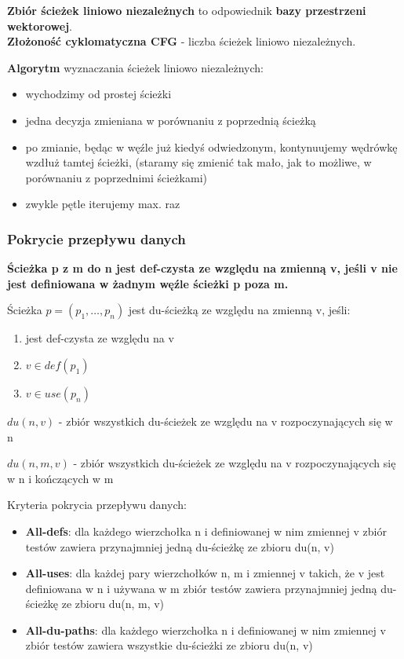 \documentclass[../main.tex]{subfiles}
\begin{document}
    \textbf{Zbiór ścieżek liniowo niezależnych} to odpowiednik \textbf{bazy przestrzeni wektorowej}.\\
    \textbf{Złożoność cyklomatyczna CFG} - liczba ścieżek liniowo niezależnych.

    \textbf{Algorytm} wyznaczania ścieżek liniowo niezależnych:
    \begin{itemize}
        \item wychodzimy od prostej ścieżki
        \item jedna decyzja zmieniana w porównaniu z poprzednią ścieżką
        \item po zmianie, będąc w węźle już kiedyś odwiedzonym, kontynuujemy wędrówkę wzdłuż tamtej ścieżki,
        (staramy się zmienić tak mało, jak to możliwe, w porównaniu z poprzednimi ścieżkami)
        \item zwykle pętle iterujemy max. raz
    \end{itemize}



    \subsubsection{Pokrycie przepływu danych}
    \textbf{Ścieżka p z m do n jest def-czysta ze względu na zmienną v, jeśli v nie jest
    definiowana w żadnym węźle ścieżki p poza m.}


    Ścieżka $p = (p_1 , \dots, p_n)$ jest du-ścieżką ze względu na zmienną v, jeśli:
    \begin{enumerate}
        \item jest def-czysta ze względu na v
        \item $v \in def(p_1)$
        \item $v \in use(p_n)$
\end{enumerate}

    $du(n, v)$ - zbiór wszystkich du-ścieżek ze względu na v rozpoczynających się w n

    $du(n, m, v)$ - zbiór wszystkich du-ścieżek ze względu na v rozpoczynających się w n i kończących w m

    Kryteria pokrycia przepływu danych:
    \begin{itemize}
        \item \textbf{All-defs}: dla każdego wierzchołka n i definiowanej w nim zmiennej v
        zbiór testów zawiera przynajmniej jedną du-ścieżkę ze zbioru du(n, v)
        \item \textbf{All-uses}: dla każdej pary wierzchołków n, m i zmiennej v takich, że v jest
        definiowana w n i używana w m zbiór testów zawiera przynajmniej jedną
        du-ścieżkę ze zbioru du(n, m, v)
        \item \textbf{All-du-paths}: dla każdego wierzchołka n i definiowanej w nim zmiennej v
        zbiór testów zawiera wszystkie du-ścieżki ze zbioru du(n, v)
\end{itemize}
\end{document}
